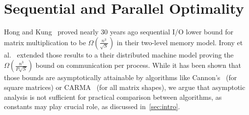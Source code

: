 \documentclass[sigplan,review,anonymous]{acmart}\settopmatter{printfolios=true,printccs=false,printacmref=false}
\newcommand\mac[1]{\textcolor{red}{[Mac: #1]}}
\begin{document}
%
%


\section{Sequential and Parallel Optimality}
\label{sec:datareuse}

Hong and Kung~\cite{redblue} proved nearly 30 years ago sequential I/O lower
bound for matrix multiplication to be $\Omega\left(\frac{n^3}{\sqrt{S}}\right)$ 
in
their two-level memory model. Irony et al.~\cite{IronyMMM} extended those
results to a their distributed machine model proving the 
$\Omega\left(\frac{n^3}{P\sqrt{S}}\right)$ bound on communication per process. 
While it
has been shown that those bounds are asymptotically attainable by algorithms
like Cannon's~\cite{Cannon} (for square matrices) or CARMA~\cite{CARMA} (for
all matrix shapes), we argue that asymptotic analysis is not sufficient for
practical comparison between algorithms, as constants may play crucial role, as
discussed in~\cref{sec:intro}.
\end{document}

